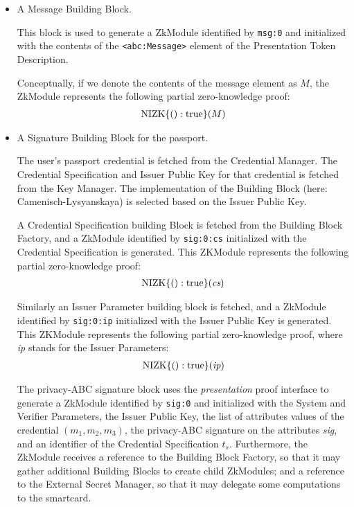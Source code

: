 \begin{itemize}
\item A Message Building Block.

This block is used to generate a ZkModule identified by \texttt{msg:0} and initialized
with the contents of the \texttt{<abc:Message>} element of the Presentation Token Description.

Conceptually, if we denote the contents of the message element as $M$, the ZkModule represents
the following partial zero-knowledge proof:
\begin{align}
\operatorname{NIZK}\lbrace(): \operatorname{true}\rbrace(M)
\label{eq:ex:top:first}
\end{align}

\item A Signature Building Block for the passport.

The user's passport credential
is fetched from the Credential Manager. The Credential Specification and Issuer Public Key for that
credential is fetched from the Key Manager. The implementation of the Building Block (here: Camenisch-Lysyanskaya)
is selected based on the Issuer Public Key.

A Credential Specification building Block is fetched from the Building Block Factory, and a ZkModule identified by
\texttt{sig:0:cs} initialized with the Credential Specification is generated.
This ZKModule represents
the following partial zero-knowledge proof:
\begin{align}
\operatorname{NIZK}\lbrace(): \operatorname{true}\rbrace(\emph{cs})
\end{align}

Similarly an Issuer Parameter building block is fetched, and a ZkModule identified by
\texttt{sig:0:ip} initialized with the Issuer Public Key is generated.
This ZKModule represents
the following partial zero-knowledge proof, where \emph{ip} stands for the Issuer Parameters:
\begin{align}
\operatorname{NIZK}\lbrace(): \operatorname{true}\rbrace(\emph{ip})
\end{align}

The privacy-ABC signature block uses the \emph{presentation} proof interface to generate a ZkModule
identified by \texttt{sig:0} and initialized with the System and Verifier Parameters,
the Issuer Public Key, the list of attributes values of the credential $(m_1, m_2, m_3)$, the privacy-ABC signature on the attributes \emph{sig},
and an identifier of the Credential Specification $t_s$.
Furthermore, the ZkModule receives a reference to the Building Block Factory, so that it may
gather additional Building Blocks to create child ZkModules; and a reference to the External Secret Manager, so that it
may delegate some computations to the smartcard.


\end{itemize}
